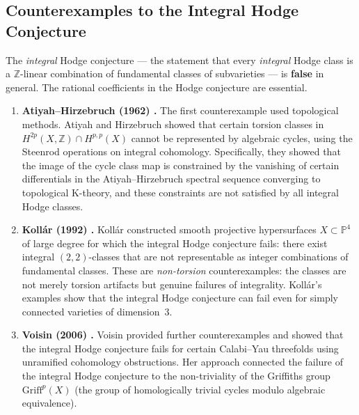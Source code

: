 \documentclass[11pt]{article}
\theoremstyle{definition}
\begin{document}
\subsection{Counterexamples to the Integral Hodge Conjecture}
\label{sec:counterexamples}

The \emph{integral} Hodge conjecture --- the statement that every
\emph{integral} Hodge class is a $\mathbb{Z}$-linear combination of
fundamental classes of subvarieties --- is \textbf{false} in general.
The rational coefficients in the Hodge conjecture are essential.

\begin{enumerate}[label=(\roman*)]
  \item \textbf{Atiyah--Hirzebruch (1962) \cite{AH}.}
    The first counterexample used topological methods.  Atiyah and
    Hirzebruch showed that certain torsion classes in $H^{2p}(X, \mathbb{Z})
    \cap H^{p,p}(X)$ cannot be represented by algebraic cycles, using the
    Steenrod operations on integral cohomology.  Specifically, they showed
    that the image of the cycle class map is constrained by the vanishing of
    certain differentials in the Atiyah--Hirzebruch spectral sequence
    converging to topological K-theory, and these constraints are not
    satisfied by all integral Hodge classes.

  \item \textbf{Koll\'ar (1992) \cite{Kollar}.}
    Koll\'ar constructed smooth projective hypersurfaces $X \subset
    \mathbb{P}^4$ of large degree for which the integral Hodge conjecture
    fails: there exist integral $(2,2)$-classes that are not representable
    as integer combinations of fundamental classes.  These are \emph{non-torsion}
    counterexamples: the classes are not merely torsion artifacts but
    genuine failures of integrality.  Koll\'ar's examples show that the
    integral Hodge conjecture can fail even for simply connected
    varieties of dimension~3.

  \item \textbf{Voisin (2006) \cite{Voisin-integral}.}
    Voisin provided further counterexamples and showed that the integral Hodge
    conjecture fails for certain Calabi--Yau threefolds using unramified
    cohomology obstructions.  Her approach connected the failure of the
    integral Hodge conjecture to the non-triviality of the Griffiths group
    $\mathrm{Griff}^p(X)$ (the group of homologically trivial cycles modulo
    algebraic equivalence).
\end{enumerate}
\end{document}
